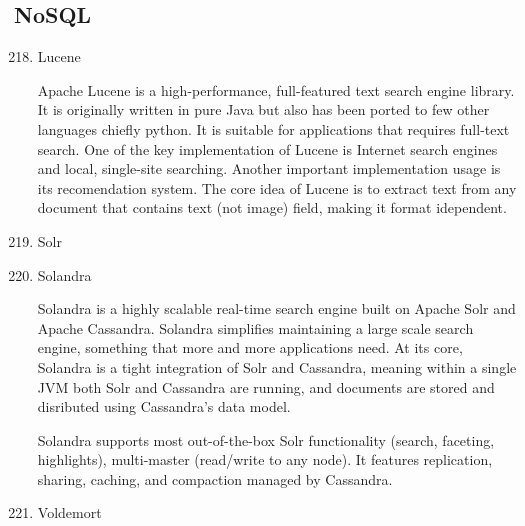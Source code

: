 \subsection{NoSQL}
\label{\detokenize{i524/technologies:nosql}}\begin{enumerate}
\setcounter{enumi}{217}
\item {} 
Lucene

Apache Lucene \label{\detokenize{i524/technologies:id392}}{\hyperref[\detokenize{i524/technologies:www-lucene}]{\sphinxcrossref{{[}336{]}}}} is a high-performance,
full-featured text search engine library.  It is originally
written in pure Java but also has been ported to few other
languages chiefly python.  It is suitable for applications that
requires full-text search.  One of the key implementation of
Lucene is Internet search engines and local, single-site
searching.  Another important implementation usage is its
recomendation system. The core idea of Lucene is to extract text
from any document that contains text (not image) field, making it
format idependent.

\item {} 
Solr

\item {} 
Solandra

Solandra is a highly scalable real-time search engine built on
Apache Solr and Apache Cassandra. Solandra simplifies maintaining
a large scale search engine, something that more and more
applications need. At its core, Solandra is a tight integration
of Solr and Cassandra, meaning within a single JVM both Solr and
Cassandra are running, and documents are stored and disributed
using Cassandra's data model. \label{\detokenize{i524/technologies:id393}}{\hyperref[\detokenize{i524/technologies:github-solandra}]{\sphinxcrossref{{[}337{]}}}}

Solandra supports most out-of-the-box Solr functionality (search,
faceting, highlights), multi-master (read/write to any node). It
features replication, sharing, caching, and compaction managed
by Cassandra. \label{\detokenize{i524/technologies:id394}}{\hyperref[\detokenize{i524/technologies:github-solandra2}]{\sphinxcrossref{{[}338{]}}}}

\item {} 
Voldemort


\end{enumerate}
